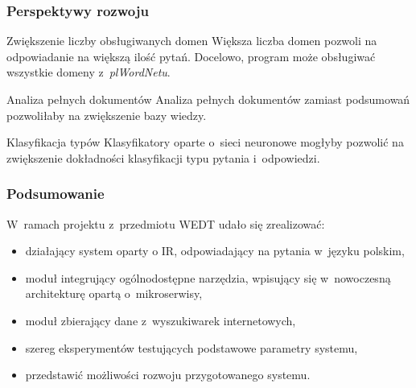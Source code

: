 \documentclass{beamer}
\begin{document}
\begin{frame}
  \frametitle{Perspektywy rozwoju}
  \begin{block}{Zwiększenie liczby obsługiwanych domen}
    Większa liczba domen pozwoli na odpowiadanie na większą ilość pytań. Docelowo, program może obsługiwać wszystkie domeny z~\textit{plWordNetu}.
  \end{block}

  \begin{block}{Analiza pełnych dokumentów}
    Analiza pełnych dokumentów zamiast podsumowań pozwoliłaby na zwiększenie bazy wiedzy.
  \end{block}

  \begin{block}{Klasyfikacja typów}
    Klasyfikatory oparte o~sieci neuronowe mogłyby pozwolić na zwiększenie dokładności klasyfikacji typu pytania i~odpowiedzi.
  \end{block}

\end{frame}

\begin{frame}
  \frametitle{Podsumowanie}
  W~ramach projektu z~przedmiotu WEDT udało się zrealizować:
  \begin{itemize}
    \item działający system oparty o IR, odpowiadający na pytania w~języku polskim,
    \item moduł integrujący ogólnodostępne narzędzia, wpisujący się w~nowoczesną architekturę opartą o~mikroserwisy,
    \item moduł zbierający dane z~wyszukiwarek internetowych,
    \item szereg eksperymentów testujących podstawowe parametry systemu,
    \item przedstawić możliwości rozwoju przygotowanego systemu.
  \end{itemize}

\end{frame}
\end{document}
